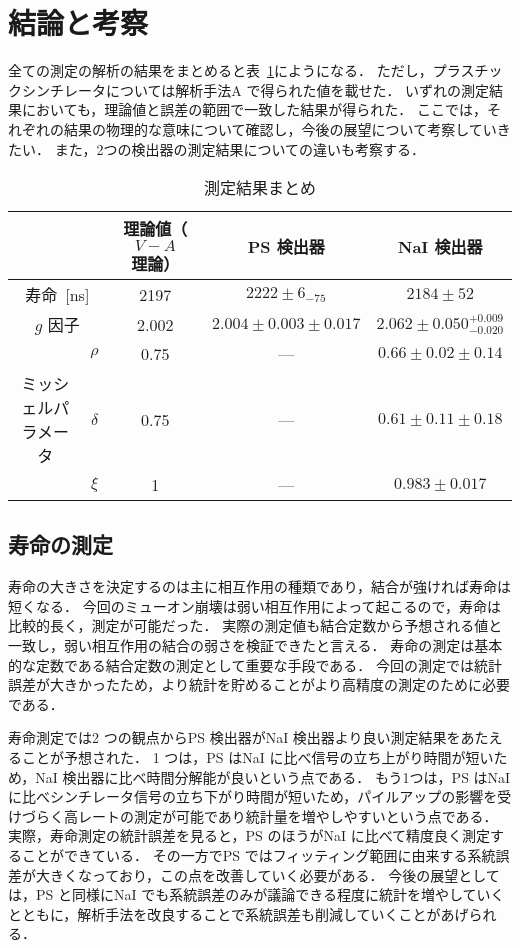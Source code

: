 \section{結論と考察}
全ての測定の解析の結果をまとめると表~\ref{tab:result_conclusion}にようになる．
ただし，プラスチックシンチレータについては解析手法A で得られた値を載せた．
いずれの測定結果においても，理論値と誤差の範囲で一致した結果が得られた．
ここでは，それぞれの結果の物理的な意味について確認し，今後の展望について考察していきたい．
また，2つの検出器の測定結果についての違いも考察する．

\begin{table}[h]
\centering
\caption{測定結果まとめ}
\label{tab:result_conclusion}
\begin{tabular}{ccccc}\toprule
{} & {} & 理論値（$V-A$理論） & PS 検出器 & NaI 検出器\\ \midrule
\multicolumn{2}{c}{寿命~[ns]} &  2197 & $2222 \pm 6_{- 75}$ & $2184 \pm 52$\\
\multicolumn{2}{c}{$g$ 因子} & 2.002 & $2.004 \pm 0.003 \pm 0.017$ & $2.062 \pm 0.050^{+0.009}_{-0.020}$\\ 
{} & $\rho$ & 0.75 & --- & $0.66 \pm 0.02 \pm 0.14$\\
ミッシェルパラメータ & $\delta$ & 0.75 & --- & $0.61 \pm 0.11 \pm 0.18$\\
{} & $\xi$ & 1 & --- & $0.983 \pm 0.017$\\ \bottomrule
\end{tabular}
\end{table}%

\subsection{寿命の測定}
寿命の大きさを決定するのは主に相互作用の種類であり，結合が強ければ寿命は短くなる．
今回のミューオン崩壊は弱い相互作用によって起こるので，寿命は比較的長く，測定が可能だった．
実際の測定値も結合定数から予想される値と一致し，弱い相互作用の結合の弱さを検証できたと言える．
寿命の測定は基本的な定数である結合定数の測定として重要な手段である．
今回の測定では統計誤差が大きかったため，より統計を貯めることがより高精度の測定のために必要である．

寿命測定では2 つの観点からPS 検出器がNaI 検出器より良い測定結果をあたえることが予想された．
1 つは，PS はNaI に比べ信号の立ち上がり時間が短いため，NaI 検出器に比べ時間分解能が良いという点である．
もう1つは，PS はNaI に比べシンチレータ信号の立ち下がり時間が短いため，パイルアップの影響を受けづらく高レートの測定が可能であり統計量を増やしやすいという点である．
実際，寿命測定の統計誤差を見ると，PS のほうがNaI に比べて精度良く測定することができている．
その一方でPS ではフィッティング範囲に由来する系統誤差が大きくなっており，この点を改善していく必要がある．
今後の展望としては，PS と同様にNaI でも系統誤差のみが議論できる程度に統計を増やしていくとともに，解析手法を改良することで系統誤差も削減していくことがあげられる．%

